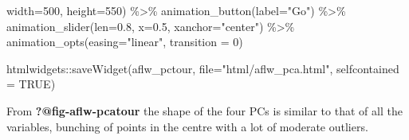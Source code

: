 \documentclass[
  letterpaper,
]{krantz}
\newenvironment{Shaded}{\begin{snugshade}}{\end{snugshade}}
\newcommand{\AttributeTok}[1]{\textcolor[rgb]{0.40,0.45,0.13}{#1}}
\newcommand{\ConstantTok}[1]{\textcolor[rgb]{0.56,0.35,0.01}{#1}}
\newcommand{\DecValTok}[1]{\textcolor[rgb]{0.68,0.00,0.00}{#1}}
\newcommand{\FloatTok}[1]{\textcolor[rgb]{0.68,0.00,0.00}{#1}}
\newcommand{\FunctionTok}[1]{\textcolor[rgb]{0.28,0.35,0.67}{#1}}
\newcommand{\NormalTok}[1]{\textcolor[rgb]{0.00,0.23,0.31}{#1}}
\newcommand{\SpecialCharTok}[1]{\textcolor[rgb]{0.37,0.37,0.37}{#1}}
\newcommand{\StringTok}[1]{\textcolor[rgb]{0.13,0.47,0.30}{#1}}
\begin{document}
\begin{Shaded}
\begin{Highlighting}[]
                        \AttributeTok{width=}\DecValTok{500}\NormalTok{,}
                        \AttributeTok{height=}\DecValTok{550}\NormalTok{) }\SpecialCharTok{\%\textgreater{}\%}
       \FunctionTok{animation\_button}\NormalTok{(}\AttributeTok{label=}\StringTok{"Go"}\NormalTok{) }\SpecialCharTok{\%\textgreater{}\%}
       \FunctionTok{animation\_slider}\NormalTok{(}\AttributeTok{len=}\FloatTok{0.8}\NormalTok{, }\AttributeTok{x=}\FloatTok{0.5}\NormalTok{,}
                        \AttributeTok{xanchor=}\StringTok{"center"}\NormalTok{) }\SpecialCharTok{\%\textgreater{}\%}
       \FunctionTok{animation\_opts}\NormalTok{(}\AttributeTok{easing=}\StringTok{"linear"}\NormalTok{, }\AttributeTok{transition =} \DecValTok{0}\NormalTok{)}

\NormalTok{htmlwidgets}\SpecialCharTok{::}\FunctionTok{saveWidget}\NormalTok{(aflw\_pctour,}
          \AttributeTok{file=}\StringTok{"html/aflw\_pca.html"}\NormalTok{,}
          \AttributeTok{selfcontained =} \ConstantTok{TRUE}\NormalTok{)}
\end{Highlighting}
\end{Shaded}

From \textbf{?@fig-aflw-pcatour} the shape of the four PCs is similar to
that of all the variables, bunching of points in the centre with a lot
of moderate outliers.
\end{document}
